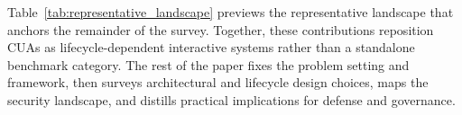 Table~\ref{tab:representative_landscape} previews the representative landscape that anchors the remainder of the survey. Together, these contributions reposition CUAs as lifecycle-dependent interactive systems rather than a standalone benchmark category. The rest of the paper fixes the problem setting and framework, then surveys architectural and lifecycle design choices, maps the security landscape, and distills practical implications for defense and governance.
